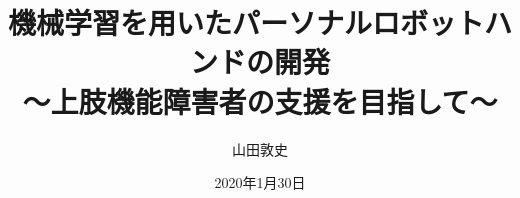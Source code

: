 \title{機械学習を用いたパーソナルロボットハンドの開発\\～上肢機能障害者の支援を目指して〜} %
\date{2020年1月30日} %
\author{山田敦史} %
\seifuku{} %
